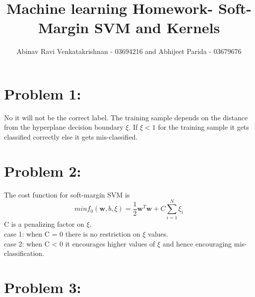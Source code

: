 \documentclass[5pt,a4paper]{article}
\begin{document}
	\title{Machine learning Homework- Soft-Margin SVM and Kernels }
	\author{Abinav Ravi Venkatakrishnan - 03694216 and Abhijeet Parida - 03679676}
	\maketitle
	\section*{Problem 1:}
	No it will not be the correct label. The training sample depends on the distance from the hyperplane decision boundary $\xi$. If $ \xi < 1 $ for the training sample it gets classified correctly else it gets mis-classified.
	
	\section*{Problem 2:}
	The cost function for soft-margin SVM is 
	\begin{equation}
	min f_0(\textbf{w},b,\xi) = \frac{1}{2}\textbf{w}^T \textbf{w}+ C \sum_{i=1}^{N} \xi_i
	\end{equation}
	C is a penalizing factor on $ \xi $. \\
	case 1: when C = 0 there is no restriction on $\xi$ values.\\
	case 2: when C < 0 it encourages higher values of $\xi$ and hence encouraging mis-classification.  
	\section*{Problem 3:}
	\begin{figure}[!h]%
		\centering
		\qquad
		\caption{}%
	\end{figure}
\end{document}
